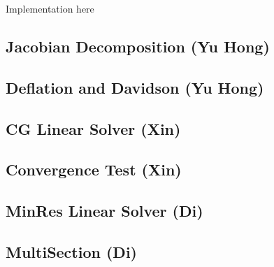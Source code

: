Implementation here
\subsection{Jacobian Decomposition (Yu Hong)}
\subsection{Deflation and Davidson (Yu Hong)}
\subsection{CG Linear Solver (Xin)}
\subsection{Convergence Test (Xin)}
\subsection{MinRes Linear Solver (Di)}
\subsection{MultiSection (Di)}